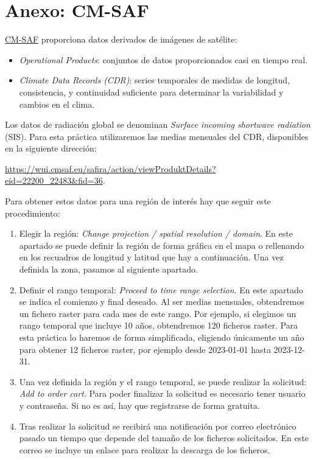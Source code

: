 \documentclass[11pt]{article}
\begin{document}
\clearpage

\section{Anexo: CM-SAF}
\label{sec:cmsaf}
\href{https://wui.cmsaf.eu/safira/action/viewProduktSearch}{CM-SAF}
proporciona datos derivados de imágenes de satélite:
\begin{itemize}
\item \emph{Operational Products}: conjuntos de datos proporcionados casi en
  tiempo real.

\item \emph{Climate Data Records (CDR)}: series temporales de medidas de
  longitud, consistencia, y continuidad suficiente para determinar la
  variabilidad y cambios en el clima.
\end{itemize}

Los datos de radiación global se denominan \emph{Surface incoming
  shortwave radiation} (SIS). Para esta práctica utilizaremos las medias mensuales del CDR, disponibles en la siguiente dirección:

\url{https://wui.cmsaf.eu/safira/action/viewProduktDetails?eid=22200_22483&fid=36}.

Para obtener estos datos para una región de interés hay que seguir
este procedimiento:
\begin{enumerate}
\item Elegir la región: \emph{Change projection / spatial resolution /
    domain}. En este apartado se puede definir la región de forma
  gráfica en el mapa o rellenando en los recuadros de longitud y
  latitud que hay a continuación. Una vez definida la zona, pasamos al
  siguiente apartado.
\item Definir el rango temporal: \emph{Proceed to time range
    selection}. En este apartado se indica el comienzo y final
  deseado. Al ser medias mensuales, obtendremos un fichero raster para
  cada mes de este rango. Por ejemplo, si elegimos un rango temporal
  que incluye 10 años, obtendremos 120 ficheros raster. Para esta
  práctica lo haremos de forma simplificada, eligiendo únicamente
  un año para obtener 12 ficheros raster, por ejemplo desde 2023-01-01
  hasta 2023-12-31.
\item Una vez definida la región y el rango temporal, se puede
  realizar la solicitud: \emph{Add to order cart}. Para poder
  finalizar la solicitud es necesario tener usuario y contraseña. Si
  no es así, hay que registrarse de forma gratuita.
\item Tras realizar la solicitud se recibirá una notificación por
  correo electrónico pasado un tiempo que depende del tamaño de los
  ficheros solicitados. En este correo se incluye un enlace para
  realizar la descarga de los ficheros.
\end{enumerate}
\end{document}
